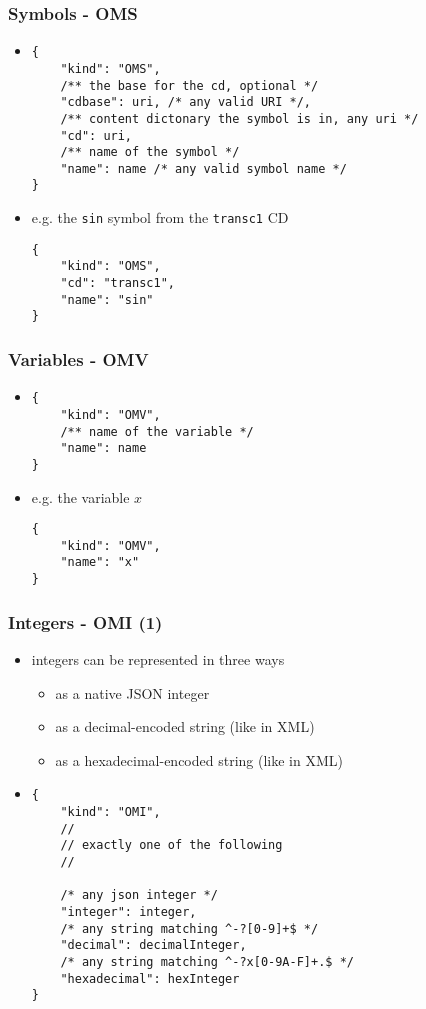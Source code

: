 \documentclass[usenames,dvipsnames]{beamer}
\begin{document}
\begin{frame}[fragile]
    \frametitle{Symbols - OMS}
    \begin{itemize}
        \item
\begin{lstlisting}
{
    "kind": "OMS",
    /** the base for the cd, optional */
    "cdbase": uri, /* any valid URI */, 
    /** content dictonary the symbol is in, any uri */
    "cd": uri,
    /** name of the symbol */
    "name": name /* any valid symbol name */
}
\end{lstlisting}
        \item e.g. the \texttt{sin} symbol from the \texttt{transc1} CD
\begin{lstlisting}
{
    "kind": "OMS",
    "cd": "transc1",
    "name": "sin"
}
\end{lstlisting}
    \end{itemize}
\end{frame}

\begin{frame}[fragile]
    \frametitle{Variables - OMV}
\begin{itemize}
        \item
\begin{lstlisting}
{
    "kind": "OMV",
    /** name of the variable */
    "name": name
}
\end{lstlisting}
        \item e.g. the variable $x$
\begin{lstlisting}
{
    "kind": "OMV",
    "name": "x"
}
\end{lstlisting}
    \end{itemize}
\end{frame}

\begin{frame}[fragile]
    \frametitle{Integers - OMI (1)}
    \begin{itemize}
        \item integers can be represented in three ways
        \begin{itemize}
            \item as a native JSON integer
            \item as a decimal-encoded string (like in XML)
            \item as a hexadecimal-encoded string (like in XML)
        \end{itemize}
        \item 
\begin{lstlisting}
{
    "kind": "OMI",
    //
    // exactly one of the following
    //

    /* any json integer */
    "integer": integer,
    /* any string matching ^-?[0-9]+$ */
    "decimal": decimalInteger,
    /* any string matching ^-?x[0-9A-F]+.$ */
    "hexadecimal": hexInteger
}
\end{lstlisting}
    \end{itemize}
\end{frame}
\end{document}
